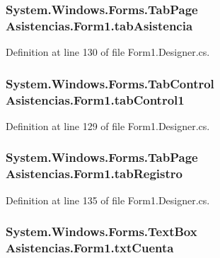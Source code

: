 \hypertarget{class_asistencias_1_1_form1_aa913fe8ba5b1cbb7255a471048604b41}{
\subsubsection[{tab\-Asistencia}]{\setlength{\rightskip}{0pt plus 5cm}System.\-Windows.\-Forms.\-Tab\-Page Asistencias.\-Form1.\-tab\-Asistencia\hspace{0.3cm}{\ttfamily [private]}}}\label{class_asistencias_1_1_form1_aa913fe8ba5b1cbb7255a471048604b41}


Definition at line 130 of file Form1.\-Designer.\-cs.

\hypertarget{class_asistencias_1_1_form1_aa2b7468a7886a62abbe1c4212612ce62}{
\subsubsection[{tab\-Control1}]{\setlength{\rightskip}{0pt plus 5cm}System.\-Windows.\-Forms.\-Tab\-Control Asistencias.\-Form1.\-tab\-Control1\hspace{0.3cm}{\ttfamily [private]}}}\label{class_asistencias_1_1_form1_aa2b7468a7886a62abbe1c4212612ce62}


Definition at line 129 of file Form1.\-Designer.\-cs.

\hypertarget{class_asistencias_1_1_form1_a66b088d224d89e584af2d7109e749aab}{
\subsubsection[{tab\-Registro}]{\setlength{\rightskip}{0pt plus 5cm}System.\-Windows.\-Forms.\-Tab\-Page Asistencias.\-Form1.\-tab\-Registro\hspace{0.3cm}{\ttfamily [private]}}}\label{class_asistencias_1_1_form1_a66b088d224d89e584af2d7109e749aab}


Definition at line 135 of file Form1.\-Designer.\-cs.

\hypertarget{class_asistencias_1_1_form1_ab4dccefe2780aacefa91410f1c99e97a}{
\subsubsection[{txt\-Cuenta}]{\setlength{\rightskip}{0pt plus 5cm}System.\-Windows.\-Forms.\-Text\-Box Asistencias.\-Form1.\-txt\-Cuenta\hspace{0.3cm}{\ttfamily [private]}}}\label{class_asistencias_1_1_form1_ab4dccefe2780aacefa91410f1c99e97a}


